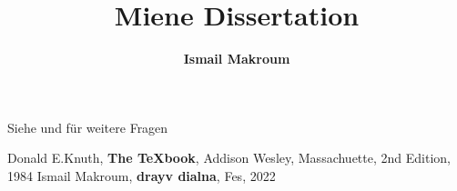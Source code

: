 \documentclass[ngerman,12pt]{scrartcl}
\author{\textbf{ Ismail Makroum}}
\title{Miene Dissertation}
\begin{document}
\maketitle

\tableofcontents

Siehe \cite{knuth} und \cite{Makroum}für weitere Fragen

\blindtext

\begin{thebibliography}{9} %
 Donald E.Knuth, \textbf{The \TeX  book}, Addison Wesley, Massachuette, 2nd Edition, 1984
  Ismail Makroum, \textbf{drayv dialna}, Fes, 2022


\end{thebibliography}
\end{document}
